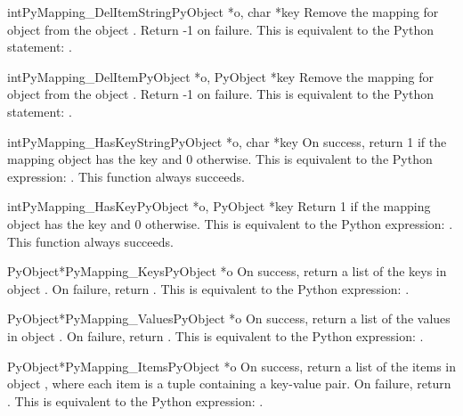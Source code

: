      \begin{cfuncdesc}{int}{PyMapping_DelItemString}{PyObject *o, char *key}
	 Remove the mapping for object  from the object .
	 Return -1 on failure.  This is equivalent to
	 the Python statement: .
     \end{cfuncdesc}


     \begin{cfuncdesc}{int}{PyMapping_DelItem}{PyObject *o, PyObject *key}
	 Remove the mapping for object  from the object .
	 Return -1 on failure.  This is equivalent to
	 the Python statement: .
     \end{cfuncdesc}


     \begin{cfuncdesc}{int}{PyMapping_HasKeyString}{PyObject *o, char *key}
	 On success, return 1 if the mapping object has the key 
	 and 0 otherwise.  This is equivalent to the Python expression:
	 . 
	 This function always succeeds.
     \end{cfuncdesc}


     \begin{cfuncdesc}{int}{PyMapping_HasKey}{PyObject *o, PyObject *key}
	 Return 1 if the mapping object has the key 
	 and 0 otherwise.  This is equivalent to the Python expression:
	 . 
	 This function always succeeds.
     \end{cfuncdesc}


     \begin{cfuncdesc}{PyObject*}{PyMapping_Keys}{PyObject *o}
         On success, return a list of the keys in object .  On
	 failure, return {\NULL}. This is equivalent to the Python
	 expression: .
     \end{cfuncdesc}


     \begin{cfuncdesc}{PyObject*}{PyMapping_Values}{PyObject *o}
         On success, return a list of the values in object .  On
	 failure, return {\NULL}. This is equivalent to the Python
	 expression: .
     \end{cfuncdesc}


     \begin{cfuncdesc}{PyObject*}{PyMapping_Items}{PyObject *o}
         On success, return a list of the items in object , where
	 each item is a tuple containing a key-value pair.  On
	 failure, return {\NULL}. This is equivalent to the Python
	 expression: .
     \end{cfuncdesc}

